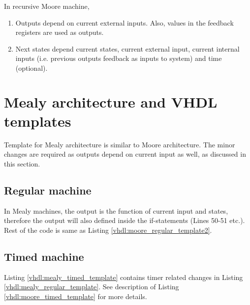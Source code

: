 \begin{noNumBox}
	In recursive Moore machine, 
	\begin{enumerate}
		\item Outputs depend on current external inputs. Also, values in the feedback registers are used as outputs.
		\item Next states depend current states, current external input, current internal inputs (i.e. previous outputs feedback as inputs to system) and time (optional).
	\end{enumerate}
\end{noNumBox}





\section{Mealy architecture and VHDL templates} \label{sec:MealyTemplates}
Template for Mealy architecture is similar to Moore architecture. The minor changes are required as outputs depend on current input as well, as discussed in this section. 
\subsection{Regular machine}
In Mealy machines, the output is the function of current input and states, therefore the output will also defined inside the if-statements (Lines 50-51 etc.). Rest of the code is same as Listing \ref{vhdl:moore_regular_template2}. 



\subsection{Timed machine}
Listing \ref{vhdl:mealy_timed_template} contains timer related changes in Listing \ref{vhdl:mealy_regular_template}. See description of Listing \ref{vhdl:moore_timed_template} for more details. 




